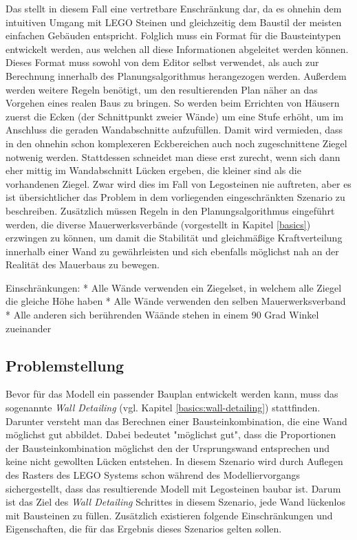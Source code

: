 Das stellt in diesem Fall eine vertretbare Enschränkung dar, da es ohnehin dem intuitiven Umgang mit LEGO Steinen und gleichzeitig dem Baustil der meisten einfachen Gebäuden entspricht.
Folglich muss ein Format für die Bausteintypen entwickelt werden, aus welchen all diese Informationen abgeleitet werden können.
Dieses Format muss sowohl von dem Editor selbst verwendet, als auch zur Berechnung innerhalb des Planungsalgorithmus herangezogen werden.
Außerdem werden weitere Regeln benötigt, um den resultierenden Plan näher an das Vorgehen eines realen Baus zu bringen.
So werden beim Errichten von Häusern zuerst die Ecken (der Schnittpunkt zweier Wände) um eine Stufe erhöht, um im Anschluss die geraden Wandabschnitte aufzufüllen.
Damit wird vermieden, dass in den ohnehin schon komplexeren Eckbereichen auch noch zugeschnittene Ziegel notwenig werden.
Stattdessen schneidet man diese erst zurecht, wenn sich dann eher mittig im Wandabschnitt Lücken ergeben, die kleiner sind als die vorhandenen Ziegel.
Zwar wird dies im Fall von Legosteinen nie auftreten, aber es ist übersichtlicher das Problem in dem vorliegenden eingeschränkten Szenario zu beschreiben.
Zusätzlich müssen Regeln in den Planungsalgorithmus eingeführt werden, die diverse Mauerwerksverbände (vorgestellt in Kapitel \ref{basics}) erzwingen zu können, um damit die Stabilität und gleichmäßige Kraftverteilung innerhalb einer Wand zu gewährleisten und sich ebenfalls möglichst nah an der Realität des Mauerbaus zu bewegen.

Einschränkungen:
 * Alle Wände verwenden ein Ziegelset, in welchem alle Ziegel die gleiche Höhe haben
 * Alle Wände verwenden den selben Mauerwerksverband
 * Alle anderen sich berührenden Wäände stehen in einem 90 Grad Winkel zueinander

\subsection{Problemstellung}
\label{scenarios:scenario1:problem}
Bevor für das Modell ein passender Bauplan entwickelt werden kann, muss das sogenannte \textit{Wall Detailing} (vgl. Kapitel \ref{basics:wall-detailing}) stattfinden.
Darunter versteht man das Berechnen einer Bausteinkombination, die eine Wand möglichst gut abbildet.
Dabei bedeutet "möglichst gut", dass die Proportionen der Bausteinkombination möglichst den der Ursprungswand entsprechen und keine nicht gewollten Lücken entstehen.
In diesem Szenario wird durch Auflegen des Rasters des LEGO Systems schon während des Modelliervorgangs sichergestellt, dass das resultierende Modell mit Legosteinen baubar ist.
Darum ist das Ziel des \textit{Wall Detailing} Schrittes in diesem Szenario, jede Wand lückenlos mit Bausteinen zu füllen.
Zusätzlich existieren folgende Einschränkungen und Eigenschaften, die für das Ergebnis dieses Szenarios gelten sollen.


